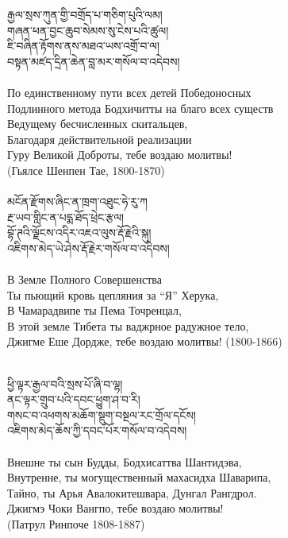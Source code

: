 {\ti རྒྱལ་སྲས་ཀུན་གྱི་བགྲོད་པ་གཅིག་པུའི་ལམ། \\
གཞན་ཕན་བྱང་ཆུབ་སེམས་སུ་ངེས་པའི་ཚུལ། \\
ཇི་བཞིན་རྟོགས་ནས་མཐའ་ཡས་འགྲོ་བ་ལ། \\
བསྟན་མཛད་དྲིན་ཆེན་བླ་མར་གསོལ་བ་འདེབས།}\\
\\
\ru
По единственному пути всех детей Победоносных\\
Подлинного метода Бодхичитты на благо всех существ\\
Ведущему бесчисленных скитальцев,\\
Благодаря действительной реализации \\
Гуру Великой Доброты, тебе воздаю молитвы!\\
\hspace{2cm}(Гьялсе Шенпен Тае, 1800-1870)\\
\\
{\ti མངོན་རྫོགས་ཞིང་ན་ཁྲག་འཐུང་ཧེ་རུ་ཀ \\
རྔ་ཡབ་གླིང་ན་པདྨ་ཐོད་ཕྲེང་རྩལ། \\
བྷོ་ཊའི་ལྗོངས་འདིར་འཇའ་ལུས་རྡོ་རྗེའི་སྐུ། \\
འཇིགས་མེད་ཡེ་ཤེས་རྡོ་རྗེར་གསོལ་བ་འདེབས།}\\
\\
\ru
В Земле Полного Совершенства\\
Ты пьющий кровь цепляния за “Я” Херука,\\
В Чамарадвипе ты Пема Точренцал,\\
В этой земле Тибета ты ваджрное радужное тело,\\
Джигме Еше Дордже, тебе воздаю молитвы! (1800-1866)\\
\\
\newpage

{\ti ཕྱི་ལྟར་རྒྱལ་བའི་སྲས་པོ་ཞི་བ་ལྷ། \\
ནང་ལྟར་གྲུབ་པའི་དབང་ཕྱུག་ཤ་བ་རི། \\
གསང་བ་འཕགས་མཆོག་སྡུག་བསྔལ་རང་གྲོལ་དངོས། \\
འཇིགས་མེད་ཆོས་ཀྱི་དབང་པོར་གསོལ་བ་འདེབས།}\\
\\
\ru
Внешне ты сын Будды, Бодхисаттва Шантидэва,\\
Внутренне, ты могущественный махасидха Шаварипа,\\
Тайно, ты Арья Авалокитешвара, Дунгал Рангдрол.\\
Джигмэ Чоки Вангпо, тебе воздаю молитвы!\\
\hspace{1cm} (Патрул Ринпоче 1808-1887)\\
\\

